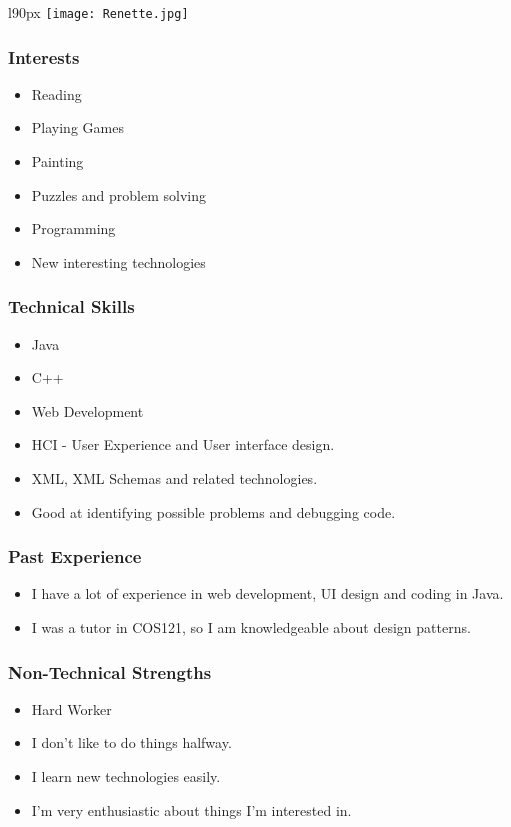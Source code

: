 \begin{wrapfigure}[8]{l}{90px}
\texttt{[image: Renette.jpg]}
\end{wrapfigure}
\textcolor{white}{}
\subsubsection{Interests}
\begin{itemize}
	\item Reading
	\item Playing Games
	\item Painting
	\item Puzzles and problem solving
	\item Programming
	\item New interesting technologies
\end{itemize}
\subsubsection{Technical Skills}
\begin{itemize}
	\item Java
	\item C++
	\item Web Development
	\item HCI - User Experience and User interface design.
	\item XML, XML Schemas and related technologies.
	\item Good at identifying possible problems and debugging code.
\end{itemize}
\subsubsection{Past Experience}
\begin{itemize}
	\item I have a lot of experience in web development, UI design and coding in Java.
	\item I was a tutor in COS121, so I am knowledgeable about design patterns.
\end{itemize}
\subsubsection{Non-Technical Strengths}
\begin{itemize}
	\item Hard Worker
	\item I don't like to do things halfway.
	\item I learn new technologies easily.
	\item I'm very enthusiastic about things I'm interested in.
\end{itemize}